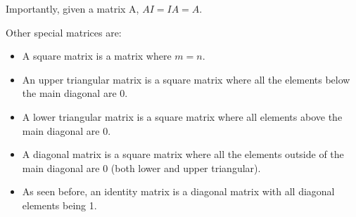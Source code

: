 \documentclass{article}
\begin{document}
Importantly, given a matrix A, $AI=IA=A$.

Other special matrices are:
\begin{itemize}
	\item A square matrix is a matrix where $m=n$.
	\item An upper triangular matrix is a square matrix where all the elements below the main diagonal are 0.
	\item A lower triangular matrix is a square matrix where all elements above the main diagonal are 0.
	\item A diagonal matrix is a square matrix where all the elements outside of the main diagonal are 0 (both lower and upper triangular).
	\item As seen before, an identity matrix is a diagonal matrix with all diagonal elements being 1.
\end{itemize}
\end{document}
